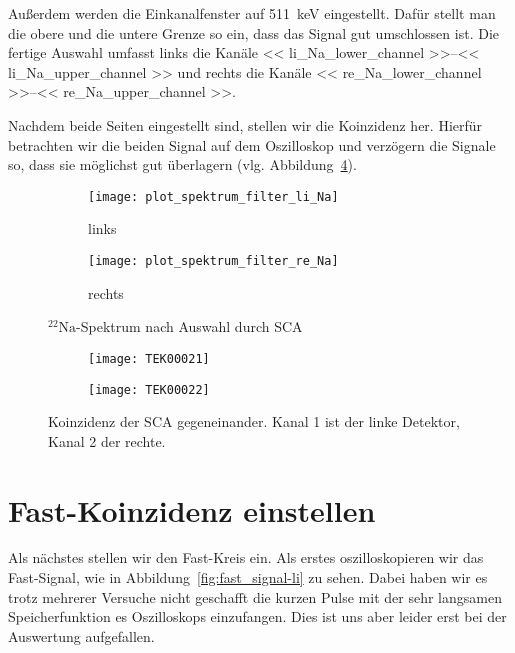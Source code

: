\documentclass[11pt, ngerman, fleqn, DIV=15, headinclude, BCOR=2cm]{scrreprt}
\begin{document}
Außerdem werden die Einkanalfenster auf \SI{511}{\kilo\electronvolt}
eingestellt. Dafür stellt man die obere und die untere Grenze so ein, dass das
Signal gut umschlossen ist. 
Die fertige Auswahl umfasst links die Kanäle
\numrange{<< li_Na_lower_channel >>}{<< li_Na_upper_channel >>} und rechts
die Kanäle
\numrange{<< re_Na_lower_channel >>}{<< re_Na_upper_channel >>}.

Nachdem beide Seiten eingestellt sind, stellen
wir die Koinzidenz her. Hierfür betrachten wir die beiden Signal auf dem
Oszilloskop und verzögern die Signale so, dass sie möglichst gut überlagern
(vlg. Abbildung~\ref{fig:slow_signal_sca_koinzidenz}).

\begin{figure}[htbp]
	\centering
	\begin{subfigure}{0.49 \textwidth}
		\texttt{[image: plot\_spektrum\_filter\_li\_Na]}
		\caption{%
			links
		}
		\label{fig:slow_sca_eingestellt-li_plot}
	\end{subfigure}
	\begin{subfigure}{0.49 \textwidth}
		\texttt{[image: plot\_spektrum\_filter\_re\_Na]}
		\caption{%
			rechts
		}
		\label{fig:slow_sca_eingestellt-re_plot}
	\end{subfigure}
	\caption{%
		$^{22}\text{Na}$-Spektrum nach Auswahl durch SCA
	}
	\label{fig:slow_signal_sca_eingestellt_plot}
\end{figure}

\begin{figure}[htbp]
	\centering
	\begin{subfigure}{0.49 \textwidth}
		\texttt{[image: TEK00021]}
	\end{subfigure}
	\begin{subfigure}{0.49 \textwidth}
		\texttt{[image: TEK00022]}
	\end{subfigure}
	\caption{%
		Koinzidenz der SCA gegeneinander. Kanal 1 ist der linke
		Detektor, Kanal 2 der rechte.
	}
	\label{fig:slow_signal_sca_koinzidenz}
\end{figure}

\clearpage

\section{Fast-Koinzidenz einstellen}
Als nächstes stellen wir den Fast-Kreis ein. Als erstes oszilloskopieren wir
das Fast-Signal, wie in Abbildung~\ref{fig:fast_signal-li} zu sehen. Dabei
haben wir es trotz mehrerer Versuche nicht geschafft die kurzen Pulse mit der
sehr langsamen Speicherfunktion es Oszilloskops einzufangen. Dies ist uns aber
leider erst bei der Auswertung aufgefallen.
\end{document}
